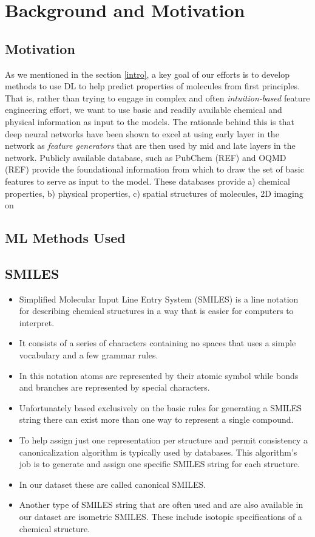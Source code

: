 \section{Background and Motivation \label{background}}
\subsection{Motivation}
As we mentioned in the section \ref{intro}, a key goal of our efforts  is to develop methods to use DL to help predict properties of molecules from first principles. That is, rather than trying to engage in complex and often {\em intuition-based} feature engineering effort, we want to use basic and readily available chemical and physical information as input to the models. The rationale behind this is that deep neural networks have been shown to excel at using early layer in the network as {\em feature generators} that are then used by mid and late layers in the network. Publicly available database, such as PubChem (REF) and OQMD (REF) provide the foundational information from which to draw the set of basic features to serve as input  to the model. These databases provide a) chemical properties, b) physical properties, c) spatial structures of molecules, 2D imaging on 
\subsection{ML Methods Used}
\subsection{SMILES}
    \begin{itemize}
        \item Simplified Molecular Input Line Entry System (SMILES) is a line notation for describing chemical structures in a way that is easier for computers to interpret. 
        \item It consists of a series of characters containing no spaces that uses a simple vocabulary and a few grammar rules.
        \item In this notation atoms are represented by their atomic symbol while bonds and branches are represented by special characters.
        \item Unfortunately based exclusively on the basic rules for generating a SMILES string there can exist more than one way to represent a single compound.
        \item To help assign just one representation per structure and permit consistency a canonicalization algorithm is typically used by databases. This algorithm's job is to generate and assign one specific SMILES string for each structure.
        \item In our dataset these are called canonical SMILES.
        \item Another type of SMILES string that are often used and are also available in our dataset are isometric SMILES. These include isotopic specifications of a chemical structure.
    \end{itemize}
